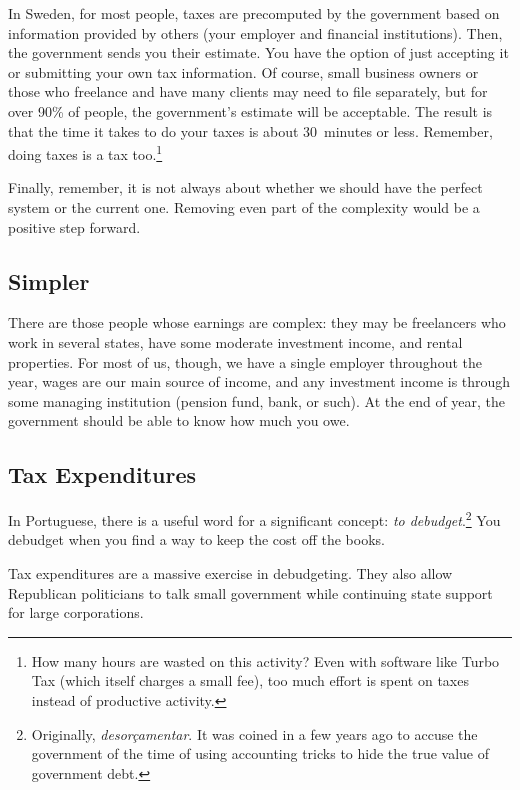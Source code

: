 In Sweden, for most people, taxes are precomputed by the government based on
information provided by others (your employer and financial institutions).
Then, the government sends you their estimate. You have the option of just
accepting it or submitting your own tax information. Of course, small business
owners or those who freelance and have many clients may need to file
separately, but for over 90\% of people, the government's estimate will be
acceptable. The result is that the time it takes to do your taxes is about
30~minutes or less. Remember, doing taxes is a tax too.\footnote{How many hours
are wasted on this activity? Even with software like Turbo Tax (which itself
charges a small fee), too much effort is spent on taxes instead of productive
activity.}%

Finally, remember, it is not always about whether we should have the perfect
system or the current one. Removing even part of the complexity would be a
positive step forward.

\subsection{Simpler}

There are those people whose earnings are complex: they may be freelancers who
work in several states, have some moderate investment income, and rental
properties. For most of us, though, we have a single employer throughout the
year, wages are our main source of income, and any investment income is through
some managing institution (pension fund, bank, or such). At the end of year,
the government should be able to know how much you owe.

\subsection{Tax Expenditures}

In Portuguese, there is a useful word for a significant concept: \emph{to
debudget}.\footnote{Originally, \emph{desorçamentar}. It was coined in a few
years ago to accuse the government of the time of using accounting tricks to
hide the true value of government debt.} You debudget when you find a way to
keep the cost off the books.

Tax expenditures are a massive exercise in debudgeting. They also allow
Republican politicians to talk small government while continuing state support
for large corporations.

